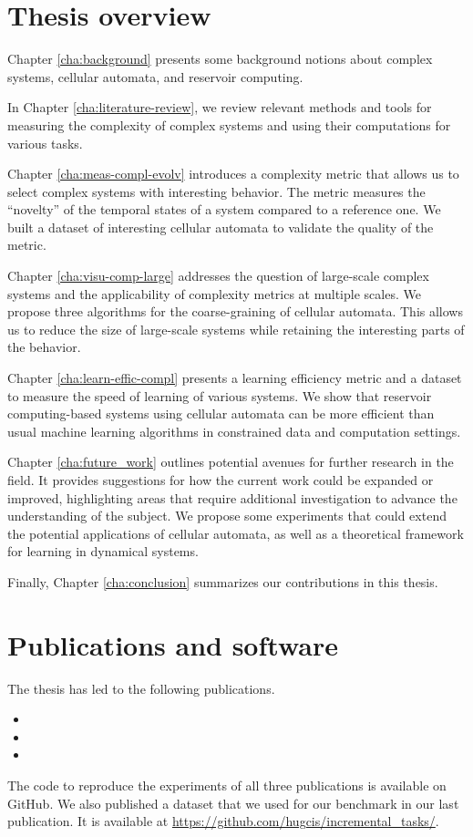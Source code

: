 \section{Thesis overview}


Chapter \ref{cha:background} presents some background notions about complex
systems, cellular automata, and reservoir computing.

In Chapter \ref{cha:literature-review}, we review relevant methods and tools for
measuring the complexity of complex systems and using their computations for
various tasks.

Chapter \ref{cha:meas-compl-evolv} introduces a complexity metric that allows us 
to select complex systems with interesting behavior. The metric measures the
``novelty'' of the temporal states of a system compared to a reference one. We
built a dataset of interesting cellular automata to validate the quality of the
metric.

Chapter \ref{cha:visu-comp-large} addresses the question of large-scale complex
systems and the applicability of complexity metrics at multiple scales. We
propose three algorithms for the coarse-graining of cellular automata. This allows
us to reduce the size of large-scale systems while retaining the interesting parts
of the behavior.

Chapter \ref{cha:learn-effic-compl} presents a learning efficiency metric and a
dataset to measure the speed of learning of various systems. We show that
reservoir computing-based systems using cellular automata can be more efficient
than usual machine learning algorithms in constrained data and computation
settings.

Chapter \ref{cha:future_work} outlines potential avenues for further research in 
the field. It provides suggestions for how the current work could be expanded or 
improved, highlighting areas that require additional investigation to advance the 
understanding of the subject. We propose some experiments that could extend the 
potential applications of cellular automata, as well as a theoretical framework 
for learning in dynamical systems.

Finally, Chapter \ref{cha:conclusion} summarizes our contributions in this thesis. 

\section{Publications and software}

The thesis has led to the following publications.

\begin{itemize}
  \item {}
  \item {}
  \item {}
\end{itemize}

The code to reproduce the experiments of all three publications is available on
GitHub. We also published a dataset that we used for our benchmark in our last
publication. It is available at
\url{https://github.com/hugcis/incremental_tasks/}.
